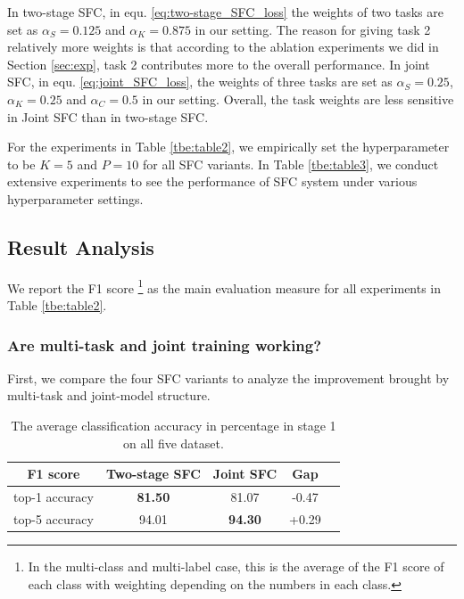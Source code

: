 In two-stage SFC, in equ. \ref{eq:two-stage_SFC_loss} the weights of two tasks
are  set  as  $\alpha_S=0.125$ and $\alpha_K=0.875$ in our setting. The reason
for  giving  task  2 relatively more weights is that according to the ablation
experiments  we  did  in Section \ref{sec:exp}, task 2 contributes more to the
overall  performance.  In  joint  SFC,  in  equ.  \ref{eq:joint_SFC_loss}, the
weights  of  three  tasks  are  set  as  $\alpha_S=0.25$,  $\alpha_K=0.25$ and
$\alpha_C=0.5$  in  our setting. Overall, the task weights are less sensitive
in Joint SFC than in two-stage SFC.

For  the  experiments  in  Table  \ref{tbe:table2},  we  empirically  set  the
hyperparameter  to  be  $K=5$  and  $P=10$  for  all  SFC  variants.  In Table
\ref{tbe:table3},  we  conduct extensive experiments to see the performance of
SFC system under various hyperparameter settings.

\subsection{Result Analysis}
We  report  the F1 score \footnote{In the multi-class and multi-label case, this
is  the  average  of  the F1 score of each class with weighting depending on the
numbers  in  each class.} as the main evaluation measure for all experiments in
Table \ref{tbe:table2}.


\subsubsection*{Are multi-task and joint training working?} 
First, we compare the four  SFC  variants to analyze the improvement
brought  by  multi-task  and  joint-model  structure. 

\begin{table}
  \begin{centering}
    \begin{tabular}{|c|c|c|c|c|}
      \hline
      F1 score & Two-stage SFC & Joint SFC & Gap & \tabularnewline
      \hline
      top-1 accuracy  & \textbf{81.50} & 81.07 & -0.47 & \tabularnewline
      top-5 accuracy & 94.01 & \textbf{94.30} & +0.29 & \tabularnewline
      \hline
    \end{tabular}
    \par
  \end{centering}
  \caption{The average classification accuracy in percentage in stage 1 on all five dataset.}
  \label{tbe:top1_5_accuracy}
\end{table}

